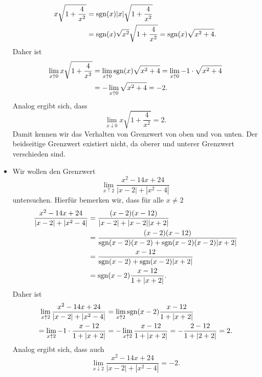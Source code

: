 \documentclass[a4paper,10pt]{article}
\begin{document}
\begin{bsp}
\begin{itemize}
   \begin{align*}
    x \sqrt{1 + \frac{4}{x^2}}
    &= \operatorname{sgn}(x) |x| \sqrt{1 + \frac{4}{x^2}} \\
    &= \operatorname{sgn}(x) \sqrt{x^2} \sqrt{1 + \frac{4}{x^2}}
    = \operatorname{sgn}(x) \sqrt{x^2 + 4}.
   \end{align*}
   Daher ist
   \begin{align*}
    \lim_{x \uparrow 0} x \sqrt{1 + \frac{4}{x^2}}
    &= \lim_{x \uparrow 0} \operatorname{sgn}(x) \sqrt{x^2 + 4}
    = \lim_{x \uparrow 0} -1 \cdot \sqrt{x^2 + 4} \\
    &= -\lim_{x \uparrow 0} \sqrt{x^2 + 4}
    = -2.
   \end{align*}
   Analog ergibt sich, dass
   \[
    \lim_{x \downarrow 0} x \sqrt{1 + \frac{4}{x^2}}
    = 2.
   \]
   Damit kennen wir das Verhalten von Grenzwert von oben und von unten. Der beidseitige Grenzwert existiert nicht, da oberer und unterer Grenzwert verschieden sind.
  \item
   Wir wollen den Grenzwert
   \[
    \lim_{x \uparrow 2} \frac{x^2 - 14x + 24}{|x-2| + |x^2-4|}
   \]
   untersuchen. Hierfür bemerken wir, dass für alle $x \neq 2$
   \begin{align*}
    \frac{x^2 - 14x + 24}{|x-2| + |x^2-4|}
    &= \frac{(x-2)(x-12)}{|x-2| + |x-2| |x+2|} \\
    &= \frac{(x-2)(x-12)}{\operatorname{sgn}(x-2)(x-2) + \operatorname{sgn}(x-2)(x-2)|x+2|} \\
    &= \frac{x-12}{\operatorname{sgn}(x-2) + \operatorname{sgn}(x-2)|x+2|} \\
    &= \operatorname{sgn}(x-2) \frac{x-12}{1 + |x+2|}.
   \end{align*}
   Daher ist
   \begin{align*}
    \lim_{x \uparrow 2} \frac{x^2 - 14x + 24}{|x-2| + |x^2-4|}
    &= \lim_{x \uparrow 2} \operatorname{sgn}(x-2) \frac{x-12}{1+|x+2|} \\
    = \lim_{x \uparrow 2} -1 \cdot \frac{x-12}{1+|x+2|}
    &= -\lim_{x \uparrow 2} \frac{x-12}{1+|x+2|}
    = - \frac{2-12}{1+|2+2|}
    = 2.
   \end{align*}
   Analog ergibt sich, dass auch
   \[
    \lim_{x \downarrow 2} \frac{x^2 - 14x + 24}{|x-2| + |x^2-4|} = -2.
   \]
 \end{itemize}
\end{bsp}
\end{document}
